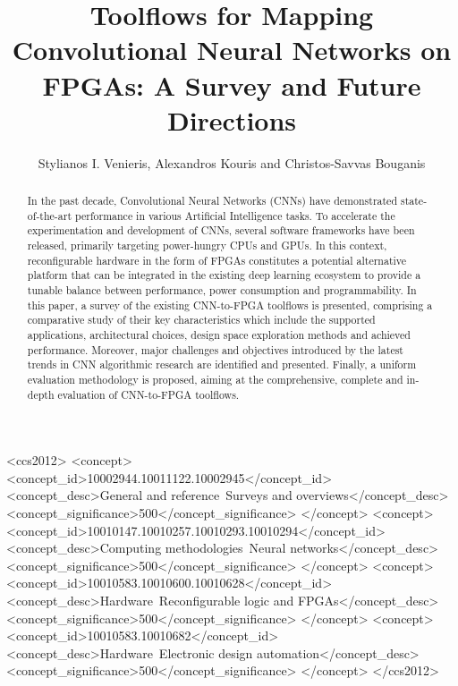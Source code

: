 \documentclass[format=acmsmall, review=false, screen=true]{acmart}
\begin{document}
\title[Toolflows for Mapping CNNs on FPGAs: A Survey and Future Directions]{Toolflows for Mapping Convolutional Neural Networks on FPGAs: A Survey and Future Directions}  

\author{Stylianos I. Venieris, Alexandros Kouris and Christos-Savvas Bouganis}

\begin{abstract}
In the past decade, Convolutional Neural Networks (CNNs) have demonstrated state-of-the-art performance in various Artificial Intelligence tasks. To accelerate the experimentation and development of CNNs, several software frameworks have been released, primarily targeting power-hungry CPUs and GPUs. In this context, reconfigurable hardware in the form of FPGAs constitutes a potential alternative platform that can be integrated in the existing {\color{black}deep learning} ecosystem to provide a tunable balance between performance, power consumption and programmability. In this paper, a survey of the existing CNN-to-FPGA toolflows is presented, comprising a comparative study of their key characteristics which include the supported applications, architectural choices, design space exploration methods and achieved performance. Moreover, major challenges and objectives introduced by the latest trends in CNN algorithmic research are identified and presented. Finally, a uniform evaluation methodology is proposed, aiming at the comprehensive, complete and in-depth evaluation of CNN-to-FPGA toolflows.
\end{abstract}


%
%
\begin{CCSXML}
<ccs2012>
<concept>
<concept_id>10002944.10011122.10002945</concept_id>
<concept_desc>General and reference~Surveys and overviews</concept_desc>
<concept_significance>500</concept_significance>
</concept>
<concept>
<concept_id>10010147.10010257.10010293.10010294</concept_id>
<concept_desc>Computing methodologies~Neural networks</concept_desc>
<concept_significance>500</concept_significance>
</concept>
<concept>
<concept_id>10010583.10010600.10010628</concept_id>
<concept_desc>Hardware~Reconfigurable logic and FPGAs</concept_desc>
<concept_significance>500</concept_significance>
</concept>
<concept>
<concept_id>10010583.10010682</concept_id>
<concept_desc>Hardware~Electronic design automation</concept_desc>
<concept_significance>500</concept_significance>
</concept>
</ccs2012>
\end{CCSXML}
\end{document}
